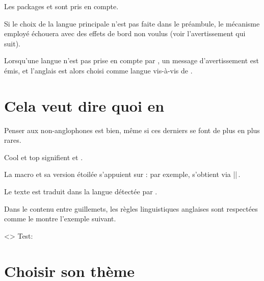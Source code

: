 \begin{tdocnote}
    Les packages  et  sont pris en compte.
\end{tdocnote}


\begin{tdoccaut}
    Si le choix de la langue principale n'est pas faite dans le préambule, le mécanisme employé échouera avec des effets de bord non voulus (voir l'avertissement qui suit).
\end{tdoccaut}


\begin{tdocwarn}
    Lorsqu'une langue n'est pas prise en compte par \thisproj, un message d'avertissement est émis, et l'anglais est alors choisi comme langue vis-à-vis de \thisproj.
\end{tdocwarn}


\section{Cela veut dire quoi en }

Penser aux non-anglophones est bien, même si ces derniers se font de plus en plus rares.

\begin{tdoclatex}
Cool et top signifient  et .
\end{tdoclatex}


La macro  et sa version étoilée s'appuient sur  : par exemple,  s'obtient via \tdoclatexin||\,.


\begin{tdocnote}
    Le texte  est traduit dans la langue détectée par \thisproj.
\end{tdocnote}


Dans le contenu entre guillemets, les règles linguistiques anglaises sont respectées comme le montre l'exemple suivant.

\begin{tdoclatex}<>
          Test:   \\
\end{tdoclatex}


\section{Choisir son thème}

